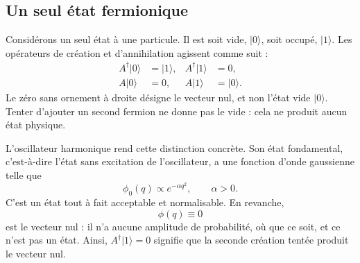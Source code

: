 \subsection{Un seul état fermionique}

Considérons un seul état à une particule. Il est soit vide, \(|0\rangle\), soit occupé, \(|1\rangle\). Les opérateurs de création et d’annihilation agissent comme suit :
\begin{align}
A^\dagger|0\rangle&=|1\rangle,
&
A^\dagger|1\rangle&=0,
\\
A|0\rangle&=0,
&
A|1\rangle&=|0\rangle.
\end{align}
Le zéro sans ornement à droite désigne le vecteur nul, et non l’état vide \(|0\rangle\). Tenter d’ajouter un second fermion ne donne pas le vide : cela ne produit aucun état physique.

\begin{classroomqa}
\end{classroomqa}

\begin{classroomqa}
\end{classroomqa}

L’oscillateur harmonique rend cette distinction concrète. Son état fondamental, c’est-à-dire l’état sans excitation de l’oscillateur, a une fonction d’onde gaussienne telle que
\begin{equation}
\phi_0(q)\propto e^{-\alpha q^2},
\qquad \alpha>0.
\end{equation}
C’est un état tout à fait acceptable et normalisable. En revanche,
\begin{equation}
\phi(q)\equiv0
\end{equation}
est le vecteur nul : il n’a aucune amplitude de probabilité, où que ce soit, et ce n’est pas un état. Ainsi, \(A^\dagger|1\rangle=0\) signifie que la seconde création tentée produit le vecteur nul.

